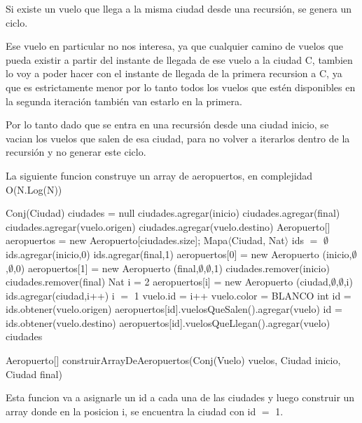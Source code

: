 Si existe un vuelo que llega a la misma ciudad desde una recursi\'on, se genera un ciclo.

Ese vuelo en particular no nos interesa, ya que cualquier camino de vuelos que pueda existir a partir del instante de llegada de ese vuelo a la ciudad C, tambien lo voy a poder hacer con el instante de llegada de la primera recursion a C, ya que es estrictamente menor por lo tanto todos los vuelos que est\'en disponibles en la segunda iteraci\'on tambi\'en van estarlo en la primera. 

Por lo tanto dado que se entra en una recursi\'on desde una ciudad inicio, se vacian los vuelos que salen de esa ciudad, para no volver a iterarlos dentro de la recursi\'on y no generar este ciclo.

\newpage

La siguiente funcion construye un array de aeropuertos, en complejidad O(N.Log(N))

\begin{algorithm}[H]
\begin{algorithmic}[1]
\STATE Conj(Ciudad) ciudades = null
\STATE ciudades.agregar(inicio)
\STATE ciudades.agregar(final)
	\STATE ciudades.agregar(vuelo.origen)
	\STATE ciudades.agregar(vuelo.destino)
\ENDFOR
\STATE Aeropuerto[] aeropuertos = new Aeropuerto[ciudades.size];
\STATE Mapa$\langle$Ciudad, Nat$\rangle$ ids $=$ $\emptyset$
\STATE ids.agregar(inicio,0)
\STATE ids.agregar(final,1)
\STATE aeropuertos[0] = new Aeropuerto (inicio,$\emptyset$,$\emptyset$,0)
\STATE aeropuertos[1] = new Aeropuerto (final,$\emptyset$,$\emptyset$,1)
\STATE ciudades.remover(inicio)
\STATE ciudades.remover(final)
\STATE Nat i = 2
	\STATE aeropuertos[i] = new Aeropuerto (ciudad,$\emptyset$,$\emptyset$,i)
	\STATE ids.agregar(ciudad,i++)
\ENDFOR
\STATE i $=$ 1
	\STATE vuelo.id = i++	
	\STATE vuelo.color = BLANCO	
	\STATE int id = ids.obtener(vuelo.origen)
	\STATE aeropuertos[id].vuelosQueSalen().agregar(vuelo)
	\STATE id = ids.obtener(vuelo.destino)
	\STATE aeropuertos[id].vuelosQueLlegan().agregar(vuelo)
\ENDFOR
\RETURN ciudades
\caption{Aeropuerto[] construirArrayDeAeropuertos(Conj(Vuelo) vuelos, Ciudad inicio, Ciudad final)}%
\end{algorithmic}
\end{algorithm}
Esta funcion va a asignarle un id a cada una de las ciudades y luego construir un array donde en la posicion i, se encuentra la ciudad con id $=$ 1.

